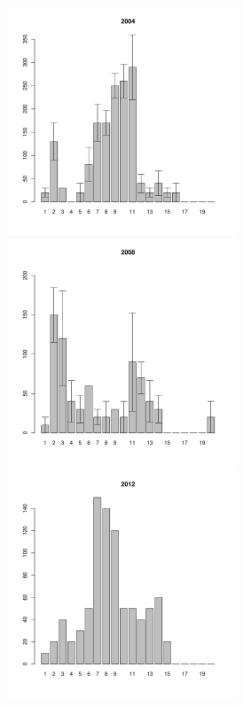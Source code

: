\begin{figure}[h]

\begin{multicols}{3}
\hfill
\includegraphics[width=60mm]{../White_Sea/Luvenga_Goreliy/low_2004_.pdf}
\hfill
\includegraphics[width=60mm]{../White_Sea/Luvenga_Goreliy/low_2008_.pdf}
\hfill
\includegraphics[width=60mm]{../White_Sea/Luvenga_Goreliy/low_2012_.pdf}
\end{multicols}




\end{figure}
